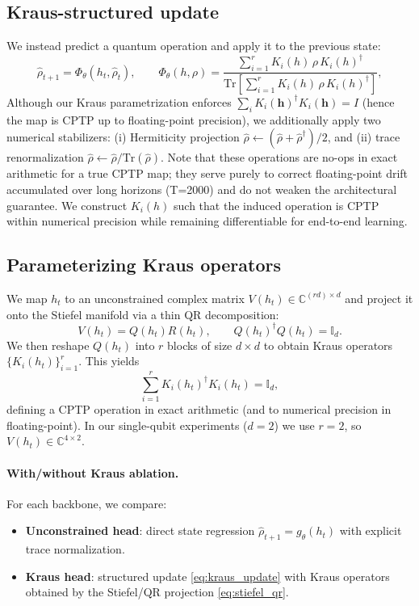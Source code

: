 \documentclass{article} %
\providecommand{\Tr}{\mathrm{Tr}}
\providecommand{\Id}{\mathbb{I}}
\providecommand{\rh}{\rho}
\begin{document}
\subsection{Kraus-structured update}
We instead predict a quantum operation and apply it to the previous state:
\begin{equation}
\widehat{\rh}_{t+1}=\Phi_\theta(h_t, \widehat{\rh}_t),
\qquad 
\Phi_\theta(h,\rh)=\frac{\sum_{i=1}^{r} K_i(h)\,\rh\,K_i(h)^\dagger}{\Tr\!\left[\sum_{i=1}^{r} K_i(h)\,\rh\,K_i(h)^\dagger\right]},
\label{eq:kraus_update}
\end{equation}
Although our Kraus parametrization enforces $\sum_i K_i(\mathbf{h})^\dagger K_i(\mathbf{h}) = I$ (hence the map is CPTP up to floating-point precision), we additionally apply two numerical stabilizers: (i) Hermiticity projection $\hat{\rho} \leftarrow (\hat{\rho} + \hat{\rho}^\dagger)/2$, and (ii) trace renormalization $\hat{\rho} \leftarrow \hat{\rho}/\text{Tr}(\hat{\rho})$. Note that these operations are no-ops in exact arithmetic for a true CPTP map; they serve purely to correct floating-point drift accumulated over long horizons (T=2000) and do not weaken the architectural guarantee. We construct $K_i(h)$ such that the induced operation is CPTP within numerical precision while remaining differentiable for end-to-end learning\cite{Cattabriga_2021}.


\subsection{Parameterizing Kraus operators}
We map $h_t$ to an unconstrained complex matrix $V(h_t)\in\mathbb{C}^{(rd)\times d}$ and project it onto the Stiefel manifold via a thin QR decomposition\cite{ateeq2025geometric}:
\begin{equation}
V(h_t)=Q(h_t)R(h_t),\qquad Q(h_t)^\dagger Q(h_t)=\Id_d.
\label{eq:stiefel_qr}
\end{equation}
We then reshape $Q(h_t)$ into $r$ blocks of size $d\times d$ to obtain Kraus operators $\{K_i(h_t)\}_{i=1}^r$. This yields
\begin{equation}
\sum_{i=1}^{r}K_i(h_t)^\dagger K_i(h_t)=\Id_d,
\end{equation}
defining a CPTP operation in exact arithmetic (and to numerical precision in floating-point). In our single-qubit experiments ($d=2$) we use $r=2$, so $V(h_t)\in\mathbb{C}^{4\times 2}$.

\paragraph{With/without Kraus ablation.}
For each backbone, we compare:
\begin{itemize}
  \item \textbf{Unconstrained head}: direct state regression $\widehat{\rh}_{t+1}=g_\theta(h_t)$ with explicit trace normalization.
  \item \textbf{Kraus head}: structured update \eqref{eq:kraus_update} with Kraus operators obtained by the Stiefel/QR projection \eqref{eq:stiefel_qr}.
\end{itemize}
\end{document}
